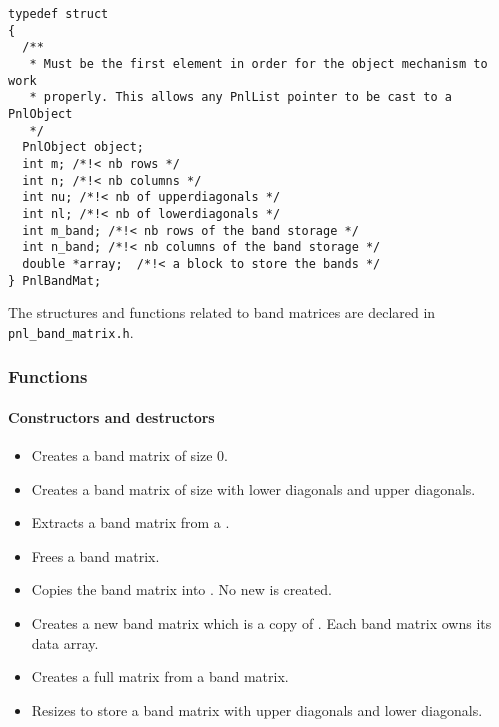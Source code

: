 \begin{verbatim}
typedef struct
{
  /**
   * Must be the first element in order for the object mechanism to work
   * properly. This allows any PnlList pointer to be cast to a PnlObject
   */
  PnlObject object; 
  int m; /*!< nb rows */ 
  int n; /*!< nb columns */ 
  int nu; /*!< nb of upperdiagonals */
  int nl; /*!< nb of lowerdiagonals */
  int m_band; /*!< nb rows of the band storage */
  int n_band; /*!< nb columns of the band storage */
  double *array;  /*!< a block to store the bands */  
} PnlBandMat;
\end{verbatim}


The structures and functions related to band matrices are declared in
\verb!pnl_band_matrix.h!. 


\subsubsection{Functions}
\paragraph{Constructors and destructors}
\begin{itemize}
  \item {}
  \sshortdescribe Creates a band matrix of size 0.

\item {}
  \sshortdescribe Creates a band matrix of size  with  lower
  diagonals and  upper diagonals.

\item {}
  \sshortdescribe Extracts a band matrix from a .

\item {}
  \sshortdescribe Frees a band matrix.

\item {}
  \sshortdescribe Copies the band matrix  into . No new
   is created.

\item {}
  \sshortdescribe Creates a new band matrix which is a copy of . Each
  band matrix owns its data array.

\item {}
  \sshortdescribe Creates a full matrix from a band matrix.

\item {}
  \sshortdescribe Resizes  to store a  band matrix with
   upper diagonals and  lower diagonals.
\end{itemize}
